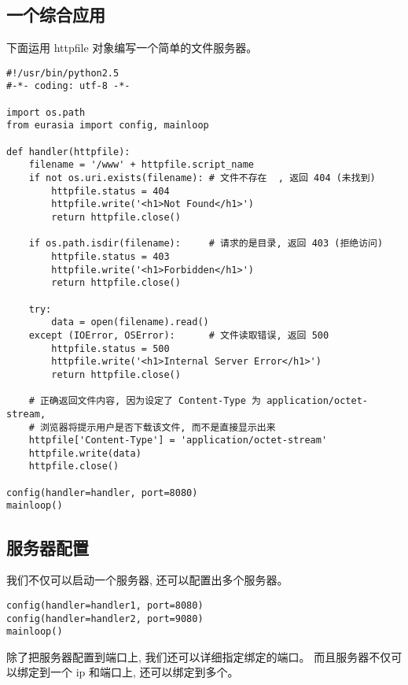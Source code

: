 \documentclass{manual}
\begin{document}

\subsection{一个综合应用}

下面运用 httpfile 对象编写一个简单的文件服务器。


\begin{verbatim}
#!/usr/bin/python2.5
#-*- coding: utf-8 -*-

import os.path
from eurasia import config, mainloop

def handler(httpfile):
	filename = '/www' + httpfile.script_name
	if not os.uri.exists(filename): # 文件不存在  , 返回 404 (未找到)
		httpfile.status = 404
		httpfile.write('<h1>Not Found</h1>')
		return httpfile.close()

	if os.path.isdir(filename):     # 请求的是目录, 返回 403 (拒绝访问)
		httpfile.status = 403
		httpfile.write('<h1>Forbidden</h1>')
		return httpfile.close()

	try:
		data = open(filename).read()
	except (IOError, OSError):      # 文件读取错误, 返回 500
		httpfile.status = 500
		httpfile.write('<h1>Internal Server Error</h1>')
		return httpfile.close()

	# 正确返回文件内容, 因为设定了 Content-Type 为 application/octet-stream,
	# 浏览器将提示用户是否下载该文件, 而不是直接显示出来
	httpfile['Content-Type'] = 'application/octet-stream'
	httpfile.write(data)
	httpfile.close()

config(handler=handler, port=8080)
mainloop()
\end{verbatim}

\subsection{服务器配置}

我们不仅可以启动一个服务器, 还可以配置出多个服务器。

\begin{verbatim}
config(handler=handler1, port=8080)
config(handler=handler2, port=9080)
mainloop()
\end{verbatim}

除了把服务器配置到端口上, 我们还可以详细指定绑定的端口。
而且服务器不仅可以绑定到一个 ip 和端口上, 还可以绑定到多个。
\end{document}
